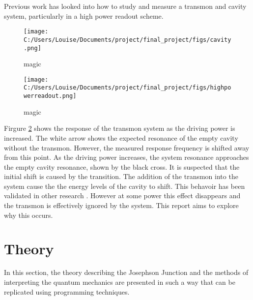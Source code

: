 \documentclass[11pt]{article}
\begin{document}
Previous work has looked into how to study and measure a transmon and cavity system, particularly in a high power readout scheme. 
\begin{figure}[ht]
\centering
\texttt{[image: C:/Users/Louise/Documents/project/final\_project/figs/cavity.png]}
\caption{magic}
\label{fig:picture2}
\end{figure}
\begin{figure}[ht]
\centering
\texttt{[image: C:/Users/Louise/Documents/project/final\_project/figs/highpowerreadout.png]}
\caption{magic}
\label{fig:picture3}
\end{figure}
Firgure \ref{fig:picture3} shows the response of the transmon system as the driving power is increased. The white arrow shows the expected resonance of the empty cavity without the transmon. However, the measured response frequency is shifted away from this point. As the driving power increases, the system resonance approaches the empty cavity resonance, shown by the black cross. It is suspected that the initial shift is caused by the transition. The addition of the transmon into the system cause the the energy levels of the cavity to shift. This behavoir has been validated in other research \cite{bishopResponseStronglyDriven2010,paikObservationHighCoherence2011,elliottApplicationsFokkerPlanckEquation2016}. However at some power this effect disappears and the transmon is effectively ignored by the system. This report aims to explore why this occurs.


\section{Theory}
In this section, the theory describing the Josephson Junction and the methods of interpreting the quantum mechanics are presented in such a way that can be replicated using programming techniques.
\end{document}
